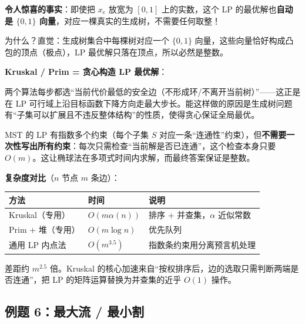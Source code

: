 \documentclass[12pt, a4paper]{ctexart}
\begin{document}
\begin{blackboard}
\textbf{令人惊喜的事实}：即使把 $x_e$ 放宽为 $[0,1]$ 上的实数，这个 LP 的最优解也\textbf{自动是 $\{0,1\}$ 向量}，对应一棵真实的生成树，不需要任何取整！

为什么？直觉：生成树集合中每棵树对应一个 $\{0,1\}$ 向量，这些向量恰好构成凸包的顶点（极点），LP 最优解只落在顶点，所以必然是整数。

\textbf{Kruskal / Prim = 贪心构造 LP 最优解}：

两个算法每步都选``当前代价最低的安全边（不形成环/不离开当前树）''——这正是在 LP 可行域上沿目标函数下降方向走最大步长。能这样做的原因是生成树问题有``子集可以扩展且不违反整体结构''的性质，使得贪心保证全局最优。

\begin{keypoint}
MST 的 LP 有指数多个约束（每个子集 $S$ 对应一条``连通性''约束），但\textbf{不需要一次性写出所有约束}：每次只需检查``当前解是否已连通''，这个检查本身只要 $O(m)$。这让椭球法在多项式时间内求解，而最终答案保证是整数。
\end{keypoint}

\textbf{复杂度对比}（$n$ 节点 $m$ 条边）：

\begin{center}
\begin{tabular}{lll}
\toprule
方法 & 时间 & 说明 \\
\midrule
Kruskal（专用） & $O(m \alpha(n))$ & 排序 + 并查集，$\alpha$ 近似常数 \\
Prim + 堆（专用） & $O(m \log n)$ & 优先队列 \\
通用 LP 内点法 & $O(m^{3.5})$ & 指数条约束用分离预言机处理 \\
\bottomrule
\end{tabular}
\end{center}

差距约 $m^{2.5}$ 倍。Kruskal 的核心加速来自``按权排序后，边的选取只需判断两端是否连通''，把 LP 的矩阵运算替换为并查集的近乎 $O(1)$ 操作。

\end{blackboard}

\subsection{例题 6：最大流 / 最小割}
\end{document}
